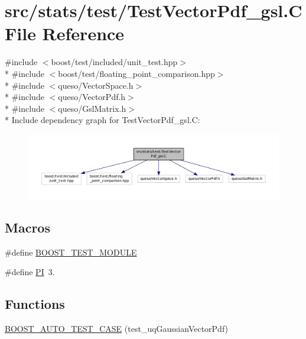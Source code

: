 \hypertarget{_test_vector_pdf__gsl_8_c}{\section{src/stats/test/\-Test\-Vector\-Pdf\-\_\-gsl.C File Reference}
\label{_test_vector_pdf__gsl_8_c}
}
{\ttfamily \#include $<$boost/test/included/unit\-\_\-test.\-hpp$>$}\\*
{\ttfamily \#include $<$boost/test/floating\-\_\-point\-\_\-comparison.\-hpp$>$}\\*
{\ttfamily \#include $<$queso/\-Vector\-Space.\-h$>$}\\*
{\ttfamily \#include $<$queso/\-Vector\-Pdf.\-h$>$}\\*
{\ttfamily \#include $<$queso/\-Gsl\-Matrix.\-h$>$}\\*
Include dependency graph for Test\-Vector\-Pdf\-\_\-gsl.\-C\-:
\nopagebreak
\begin{figure}[H]
\begin{center}
\leavevmode
\includegraphics[width=350pt]{_test_vector_pdf__gsl_8_c__incl}
\end{center}
\end{figure}
\subsection*{Macros}
\begin{DoxyCompactItemize}
\item 
\#define \hyperlink{_test_vector_pdf__gsl_8_c_a6b2a3852db8bb19ab6909bac01859985}{B\-O\-O\-S\-T\-\_\-\-T\-E\-S\-T\-\_\-\-M\-O\-D\-U\-L\-E}
\item 
\#define \hyperlink{_test_vector_pdf__gsl_8_c_a598a3330b3c21701223ee0ca14316eca}{P\-I}~3.
\end{DoxyCompactItemize}
\subsection*{Functions}
\begin{DoxyCompactItemize}
\item 
\hyperlink{_test_vector_pdf__gsl_8_c_aed6db103c62b2cc54f603fc609c15b9b}{B\-O\-O\-S\-T\-\_\-\-A\-U\-T\-O\-\_\-\-T\-E\-S\-T\-\_\-\-C\-A\-S\-E} (test\-\_\-uq\-Gaussian\-Vector\-Pdf)
\end{DoxyCompactItemize}


